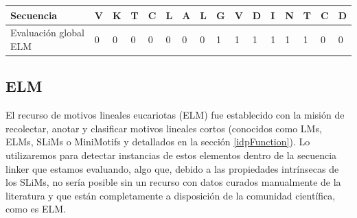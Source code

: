 \vspace{0.5cm}
\begin{adjustbox}{width=\textwidth}
\begin{tabular}{llllllllllllllll} 
\hline
Secuencia & \textbf{V} & \textbf{K} & \textbf{T} & \textbf{C} & \textbf{L} & \textbf{A} & \textbf{L} & \textbf{G} & \textbf{V} & \textbf{D} & \textbf{I} & \textbf{N} & \textbf{T} & \textbf{C} & \textbf{D}\\ \hline
Evaluación global ELM & 0 & 0 & 0 & 0 & 0 & 0 & 0 & 1 & 1 & 1 & 1 & 1 & 1 & 0 & 0 \\ \hline
\end{tabular}
\end{adjustbox}






















\subsection{ELM}\label{elm}

El recurso de motivos lineales eucariotas (ELM) \cite{puntervoll2003elm,dinkel2013eukaryotic} fue establecido con la misión de recolectar, anotar y clasificar motivos lineales cortos 
(conocidos como LMs, ELMs, SLiMs o MiniMotifs y detallados en la sección \ref{idpFunction}). 
Lo utilizaremos para detectar instancias de estos elementos dentro de la secuencia linker que estamos evaluando, algo que, debido a las propiedades intrínsecas de los SLiMs, no sería posible sin un recurso 
con datos curados manualmente de la literatura y que están completamente a disposición de la comunidad científica, como es ELM.

